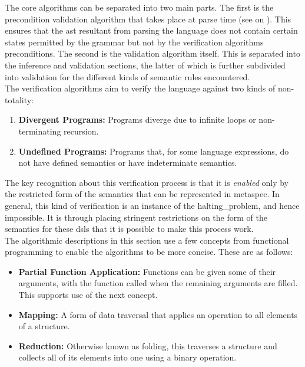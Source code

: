 The core algorithms can be separated into two main parts.
The first is the precondition validation algorithm that takes place at parse time (see  on ).
This ensures that the \gls{ast} resultant from parsing the language does not contain certain states permitted by the grammar but not by the verification algorithms preconditions. 
The second is the validation algorithm itself.
This is separated into the inference and validation sections, the latter of which is further subdivided into validation for the different kinds of semantic rules encountered. \\

The verification algorithms aim to verify the language against two kinds of non-totality:
\begin{enumerate}
    \item \textbf{Divergent Programs:} Programs \gls{diverge} due to infinite loops or non-terminating recursion.
    \item \textbf{Undefined Programs:} Programs that, for some language expressions, do not have defined semantics or have indeterminate semantics.
\end{enumerate}

The key recognition about this verification process is that it is \textit{enabled} only by the restricted form of the semantics that can be represented in \gls{metaspec}.
In general, this kind of verification is an instance of the \gls{halting_problem}, and hence impossible.
It is through placing stringent restrictions on the form of the semantics for these \glspl{dsl} that it is possible to make this process work. \\

The algorithmic descriptions in this section use a few concepts from functional programming to enable the algorithms to be more concise.
These are as follows:
\begin{itemize}
    \item \textbf{Partial Function Application:} Functions can be given some of their arguments, with the function called when the remaining arguments are filled.
    This supports use of the next concept.
    \item \textbf{Mapping:} A form of data traversal that applies an operation to all elements of a structure.
    \item \textbf{Reduction:} Otherwise known as folding, this traverses a structure and collects all of its elements into one using a binary operation. 
\end{itemize}

